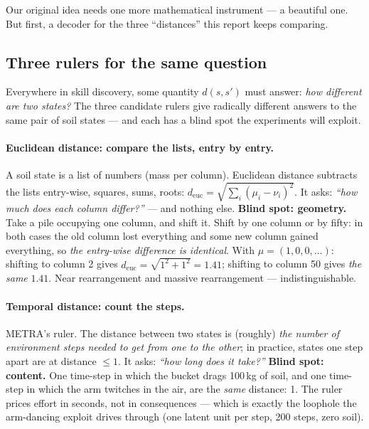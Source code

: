 \documentclass[11pt,a4paper]{article}
\begin{document}
Our original idea needs one more mathematical instrument --- a beautiful one.
But first, a decoder for the three ``distances'' this report keeps comparing.

\subsection{Three rulers for the same question}

Everywhere in skill discovery, some quantity $d(s, s')$ must answer: \emph{how
different are two states?} The three candidate rulers give radically different
answers to the same pair of soil states --- and each has a blind spot the
experiments will exploit.

\paragraph{Euclidean distance: compare the lists, entry by entry.}
A soil state is a list of numbers (mass per column). Euclidean distance
subtracts the lists entry-wise, squares, sums, roots:
$d_{\text{euc}} = \sqrt{\sum_i (\mu_i - \nu_i)^2}$. It asks: \emph{``how much
does each column differ?''} --- and nothing else. \textbf{Blind spot:
geometry.} Take a pile occupying one column, and shift it. Shift by one column
or by fifty: in both cases the old column lost everything and some new column
gained everything, so \emph{the entry-wise difference is identical}. With
$\mu = (1,0,0,\ldots)$: shifting to column 2 gives
$d_{\text{euc}} = \sqrt{1^2 + 1^2} = 1.41$; shifting to column 50 gives
\emph{the same} $1.41$. Near rearrangement and massive rearrangement ---
indistinguishable.

\paragraph{Temporal distance: count the steps.}
METRA's ruler. The distance between two states is (roughly) \emph{the number of
environment steps needed to get from one to the other}; in practice, states one
step apart are at distance $\le 1$. It asks: \emph{``how long does it take?''}
\textbf{Blind spot: content.} One time-step in which the bucket drags 100\,kg
of soil, and one time-step in which the arm twitches in the air, are the
\emph{same} distance: 1. The ruler prices effort in seconds, not in
consequences --- which is exactly the loophole the arm-dancing exploit drives
through (one latent unit per step, 200 steps, zero soil).
\end{document}
